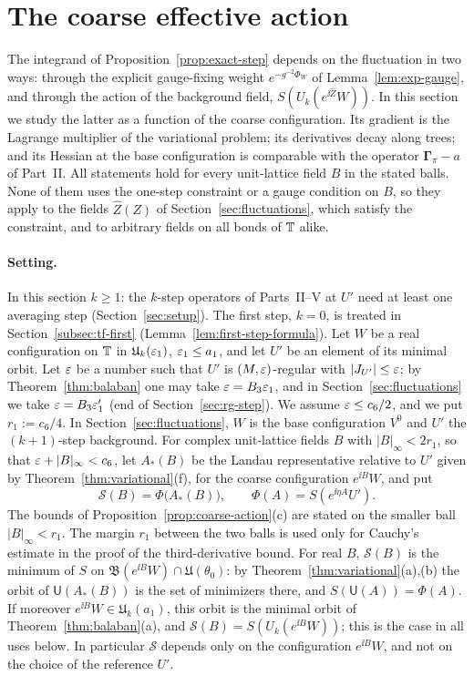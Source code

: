 \section{The coarse effective action}\label{sec:coarse-action}

The integrand of Proposition~\ref{prop:exact-step} depends on the fluctuation in two ways: through the explicit gauge-fixing weight $e^{-g^{-2}\Phi_W}$ of Lemma~\ref{lem:exp-gauge}, and through the action of the background field, $S(U_k(e^{\ii\hat Z}W))$. In this section we study the latter as a function of the coarse configuration. Its gradient is the Lagrange multiplier of the variational problem; its derivatives decay along trees; and its Hessian at the base configuration is comparable with the operator $\boldsymbol\Gamma_\pi-a$ of Part~II. All statements hold for every unit-lattice field $B$ in the stated balls. None of them uses the one-step constraint or a gauge condition on $B$, so they apply to the fields $\hat Z(Z)$ of Section~\ref{sec:fluctuations}, which satisfy the constraint, and to arbitrary fields on all bonds of $\mathbb T$ alike.

\paragraph{Setting.} In this section $k\ge1$: the $k$-step operators of Parts~II--V at $U'$ need at least one averaging step (Section~\ref{sec:setup}). The first step, $k=0$, is treated in Section~\ref{subsec:tf-first} (Lemma~\ref{lem:first-step-formula}). Let $W$ be a real configuration on $\mathbb T$ in $\mathfrak U_k(\varepsilon_1)$, $\varepsilon_1\le a_1$, and let $U'$ be an element of its minimal orbit. Let $\varepsilon$ be a number such that $U'$ is $(M,\varepsilon)$-regular with $|J_{U'}|\le\varepsilon$; by Theorem~\ref{thm:balaban} one may take $\varepsilon=B_3\varepsilon_1$, and in Section~\ref{sec:fluctuations} we take $\varepsilon=B_3\varepsilon'_1$ (end of Section~\ref{sec:rg-step}). We assume $\varepsilon\le c_6/2$, and we put $r_1:=c_6/4$. In Section~\ref{sec:fluctuations}, $W$ is the base configuration $V^0$ and $U'$ the $(k+1)$-step background. For complex unit-lattice fields $B$ with $|B|_\infty<2r_1$, so that $\varepsilon+|B|_\infty<c_6$, let $A_*(B)$ be the Landau representative relative to $U'$ given by Theorem~\ref{thm:variational}(f), for the coarse configuration $e^{\ii B}W$, and put
\[
\mathcal S(B)=\Phi\big(A_*(B)\big),\qquad\Phi(A)=S(e^{\ii\eta A}U').
\]
The bounds of Proposition~\ref{prop:coarse-action}(c) are stated on the smaller ball $|B|_\infty<r_1$. The margin $r_1$ between the two balls is used only for Cauchy's estimate in the proof of the third-derivative bound. For real $B$, $\mathcal S(B)$ is the minimum of $S$ on $\mathfrak B(e^{\ii B}W)\cap\mathfrak U(\theta_0)$: by Theorem~\ref{thm:variational}(a),(b) the orbit of $\mathsf U(A_*(B))$ is the set of minimizers there, and $S(\mathsf U(A))=\Phi(A)$. If moreover $e^{\ii B}W\in\mathfrak U_k(a_1)$, this orbit is the minimal orbit of Theorem~\ref{thm:balaban}(a), and $\mathcal S(B)=S(U_k(e^{\ii B}W))$; this is the case in all uses below. In particular $\mathcal S$ depends only on the configuration $e^{\ii B}W$, and not on the choice of the reference $U'$.

